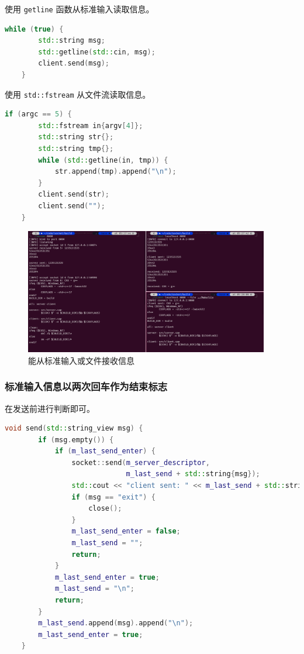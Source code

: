 \documentclass{article}
\begin{document}
使用 \texttt{getline} 函数从标准输入读取信息。

\begin{lstlisting}[language=C++]
    while (true) {
        std::string msg;
        std::getline(std::cin, msg);
        client.send(msg);
    }
\end{lstlisting}

使用 \texttt{std::fstream} 从文件流读取信息。

\begin{lstlisting}[language=C++]
    if (argc == 5) {
        std::fstream in{argv[4]};
        std::string str{};
        std::string tmp{};
        while (std::getline(in, tmp)) {
            str.append(tmp).append("\n");
        }
        client.send(str);
        client.send("");
    }
\end{lstlisting}

\begin{figure}[H]
    \centering
    \includegraphics[width=0.95\textwidth]{img/4.png}
    \caption{能从标准输入或文件接收信息}
\end{figure}

\subsubsection{标准输入信息以两次回车作为结束标志}

在发送前进行判断即可。

\begin{lstlisting}[language=C++]
    void send(std::string_view msg) {
        if (msg.empty()) {
            if (m_last_send_enter) {
                socket::send(m_server_descriptor,
                             m_last_send + std::string{msg});
                std::cout << "client sent: " << m_last_send + std::string{msg} << std::endl;
                if (msg == "exit") {
                    close();
                }
                m_last_send_enter = false;
                m_last_send = "";
                return;
            }
            m_last_send_enter = true;
            m_last_send = "\n";
            return;
        }
        m_last_send.append(msg).append("\n");
        m_last_send_enter = true;
    }
\end{lstlisting}
\end{document}
